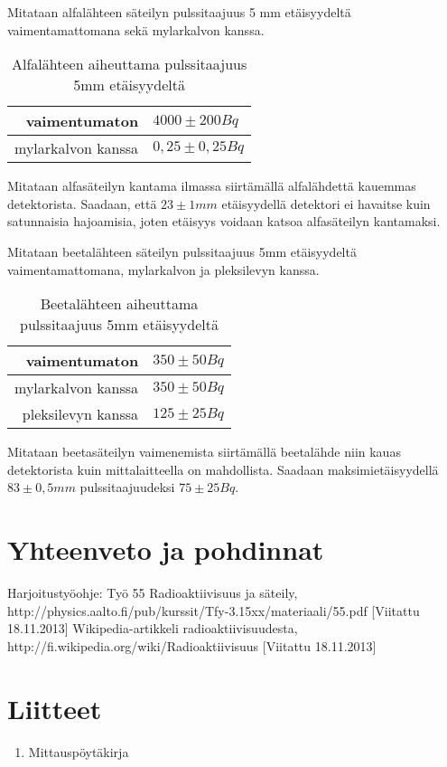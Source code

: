 \documentclass[a4paper,11pt]{article}
\begin{document}
Mitataan alfalähteen säteilyn pulssitaajuus 5 mm etäisyydeltä vaimentamattomana sekä mylarkalvon kanssa. 
\begin{table}[h]
\begin{center}
\caption{Alfalähteen aiheuttama pulssitaajuus 5mm etäisyydeltä}
\begin{tabular}{ | r | l | }
  \hline 
  vaimentumaton & $4000 \pm 200 Bq$ \\ \hline
  mylarkalvon kanssa & $0,25 \pm 0,25 Bq$ \\ \hline
\end{tabular}
\end{center}
\end{table}

Mitataan alfasäteilyn kantama ilmassa siirtämällä alfalähdettä kauemmas detektorista. Saadaan, että $23 \pm 1 mm$ etäisyydellä detektori ei havaitse kuin satunnaisia hajoamisia, joten etäisyys voidaan katsoa alfasäteilyn kantamaksi. 

Mitataan beetalähteen säteilyn pulssitaajuus 5mm etäisyydeltä vaimentamattomana, mylarkalvon ja pleksilevyn kanssa.
\begin{table}[h]
\begin{center}
\caption{Beetalähteen aiheuttama pulssitaajuus 5mm etäisyydeltä}
\begin{tabular}{ | r | l | }
  \hline
  vaimentumaton & $350 \pm 50 Bq$ \\ \hline
  mylarkalvon kanssa & $350 \pm 50 Bq$ \\ \hline
  pleksilevyn kanssa & $125 \pm 25 Bq$ \\ \hline
\end{tabular}
\end{center}
\end{table}
   
Mitataan beetasäteilyn vaimenemista siirtämällä beetalähde niin kauas detektorista kuin mittalaitteella on mahdollista. Saadaan maksimietäisyydellä $83 \pm 0,5 mm$ pulssitaajuudeksi $75 \pm 25 Bq$. 

\section{Yhteenveto ja pohdinnat}


\begin{thebibliography}{99}

 Harjoitustyöohje: Työ 55 Radioaktiivisuus ja säteily, http://physics.aalto.fi/pub/kurssit/Tfy-3.15xx/materiaali/55.pdf [Viitattu 18.11.2013]
 Wikipedia-artikkeli radioaktiivisuudesta, http://fi.wikipedia.org/wiki/Radioaktiivisuus [Viitattu 18.11.2013]

\end{thebibliography}

\section*{Liitteet}
\begin{enumerate}
\item{Mittauspöytäkirja}\label{mittaus}

\end{enumerate}
\end{document}
